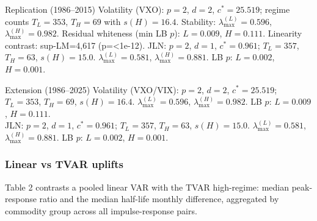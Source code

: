 \documentclass[
  11pt,
]{article}
\begin{document}
Replication (1986--2015)
Volatility (VXO): \(p=2\), \(d=2\), \(c^{*}=25.519\); regime counts \(T_L=353\), \(T_H=69\) with \(s(H)=16.4%
\). Stability: \(\lambda_{\max}^{(L)}=0.596\), \(\lambda_{\max}^{(H)}=0.982\). Residual whiteness (min LB \(p\)): \(L=0.009\), \(H=0.111\). Linearity contrast: sup-LM=4,617 (p=\textless1e-12).
JLN: \(p=2\), \(d=1\), \(c^{*}=0.961\); \(T_L=357\), \(T_H=63\), \(s(H)=15.0%
\). \(\lambda_{\max}^{(L)}=0.581\), \(\lambda_{\max}^{(H)}=0.881\). LB \(p\): \(L=0.002\), \(H=0.001\).

Extension (1986--2025)
Volatility (VXO/VIX): \(p=2\), \(d=2\), \(c^{*}=25.519\); \(T_L=353\), \(T_H=69\), \(s(H)=16.4%
\). \(\lambda_{\max}^{(L)}=0.596\), \(\lambda_{\max}^{(H)}=0.982\). LB \(p\): \(L=0.009\), \(H=0.111\).\\
JLN: \(p=2\), \(d=1\), \(c^{*}=0.961\); \(T_L=357\), \(T_H=63\), \(s(H)=15.0%
\). \(\lambda_{\max}^{(L)}=0.581\), \(\lambda_{\max}^{(H)}=0.881\). LB \(p\): \(L=0.002\), \(H=0.001\).

\subsubsection{Linear vs TVAR uplifts}\label{sec:econometricthreetwo}

Table 2 contrasts a pooled linear VAR with the TVAR high-regime: median peak-response ratio and the median half-life monthly difference, aggregated by commodity group across all impulse-response pairs.
\end{document}
